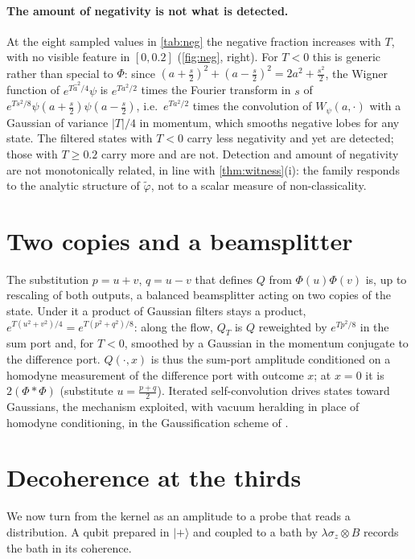 \documentclass[11pt]{article}
\theoremstyle{definition}\newtheorem{definition}[theorem]{Definition}
\theoremstyle{remark}\newtheorem{remark}[theorem]{Remark}
\begin{document}
\paragraph{The amount of negativity is not what is detected.} At the eight sampled values in \cref{tab:neg} the negative fraction increases with $T$, with no visible feature in $[0,0.2]$ (\cref{fig:neg}, right). For $T<0$ this is generic rather than special to $\Phi$: since $(a+\frac s2)^2+(a-\frac s2)^2=2a^2+\frac{s^2}2$, the Wigner function of $e^{T\hat a^2/4}\psi$ is $e^{Ta^2/2}$ times the Fourier transform in $s$ of $e^{Ts^2/8}\psi(a+\frac s2)\psi(a-\frac s2)$, i.e.\ $e^{Ta^2/2}$ times the convolution of $W_\psi(a,\cdot)$ with a Gaussian of variance $|T|/4$ in momentum, which smooths negative lobes for any state. The filtered states with $T<0$ carry less negativity and yet are detected; those with $T\ge0.2$ carry more and are not. Detection and amount of negativity are not monotonically related, in line with \cref{thm:witness}(i): the family responds to the analytic structure of $\tilde\varphi$, not to a scalar measure of non-classicality.

\section{Two copies and a beamsplitter}\label{sec:beam}
The substitution $p=u+v$, $q=u-v$ that defines $Q$ from $\Phi(u)\Phi(v)$ is, up to rescaling of both outputs, a balanced beamsplitter acting on two copies of the state. Under it a product of Gaussian filters stays a product, $e^{T(u^2+v^2)/4}=e^{T(p^2+q^2)/8}$: along the flow, $Q_T$ is $Q$ reweighted by $e^{Tp^2/8}$ in the sum port and, for $T<0$, smoothed by a Gaussian in the momentum conjugate to the difference port. $Q(\cdot,x)$ is thus the sum-port amplitude conditioned on a homodyne measurement of the difference port with outcome $x$; at $x=0$ it is $2(\Phi*\Phi)$ (substitute $u=\frac{p+q}2$). Iterated self-convolution drives states toward Gaussians, the mechanism exploited, with vacuum heralding in place of homodyne conditioning, in the Gaussification scheme of \cite{BESP}.

\section{Decoherence at the thirds}\label{sec:thirds}
We now turn from the kernel as an amplitude to a probe that reads a distribution. A qubit prepared in $|+\rangle$ and coupled to a bath by $\lambda\sigma_z\otimes B$ records the bath in its coherence.
\end{document}
